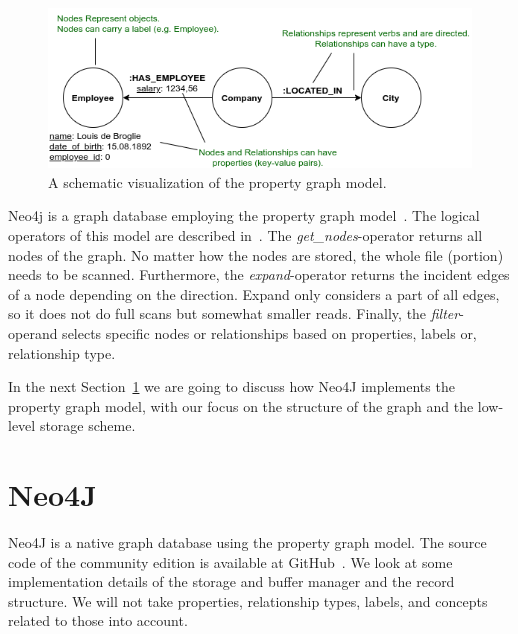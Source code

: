         \begin{figure}[htp]
            \begin{center}
                \includegraphics[keepaspectratio,width=\textwidth]{img/04-databases/property_graph_elements.png}
            \end{center}
            \caption{A schematic visualization of the property graph model.} 
            \label{propertygraph}
        \end{figure}

        
        Neo4j is a graph database employing the property graph model~\cite{robinson2015graph}.
        The logical operators of this model are described in~\autocite{Holsch2016Algeb}. 
        The \textit{get\_nodes}-operator returns all nodes of the graph.
        No matter how the nodes are stored, the whole file (portion) needs to be scanned.
        Furthermore, the \textit{expand}-operator returns the incident edges of a node depending on the direction.
        Expand only considers a part of all edges, so it does not do full scans but somewhat smaller reads.
        Finally, the \textit{filter}-operand selects specific nodes or relationships based on properties, labels or, relationship type.
        
        In the next Section~\ref{n4j} we are going to discuss how Neo4J implements the property graph model, with our focus on the structure of the graph and the low-level storage scheme.

\section{Neo4J}\label{n4j}
    Neo4J is a native graph database using the property graph model.
    The source code of the community edition is available at GitHub~\autocite{GitHubneo4j}.
    We look at some implementation details of the storage and buffer manager and the record structure.
    We will not take properties, relationship types, labels, and concepts related to those into account.
    
